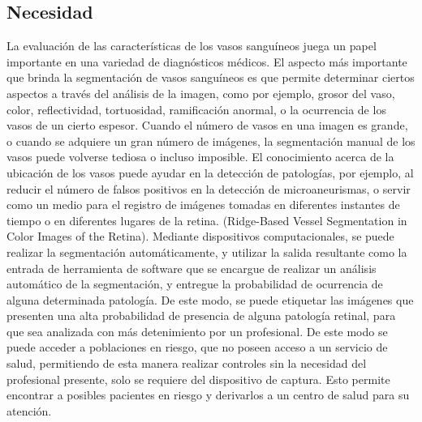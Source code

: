 \subsection{Necesidad}
La evaluaci\'on de las caracter\'isticas de los vasos sangu\'ineos  juega un papel importante en una variedad de diagn\'osticos m\'edicos. El aspecto m\'as importante que brinda la segmentaci\'on de vasos sangu\'ineos es que permite determinar ciertos aspectos a trav\'es del an\'alisis de la imagen, como por ejemplo, grosor del vaso, color, reflectividad, tortuosidad, ramificaci\'on anormal, o la ocurrencia de los vasos de un cierto espesor. Cuando el n\'umero de vasos en una imagen es grande, o cuando se adquiere un gran n\'umero de im\'agenes, la segmentaci\'on manual de los vasos puede volverse tediosa o incluso imposible. El conocimiento acerca de la ubicaci\'on de los vasos puede ayudar en la detecci\'on de patolog\'ias, por ejemplo, al reducir el n\'umero de falsos positivos en la detecci\'on de microaneurismas, o servir como un medio para el registro de im\'agenes tomadas en diferentes instantes de tiempo o en diferentes lugares de la retina. (Ridge-Based Vessel Segmentation in Color Images of the Retina).
Mediante dispositivos computacionales, se puede realizar la segmentación autom\'aticamente, y utilizar la salida resultante como la entrada de herramienta de software que se encargue de  realizar un an\'alisis autom\'atico de la segmentaci\'on, y entregue la probabilidad de ocurrencia de alguna determinada patolog\'ia. De este modo, se puede etiquetar las im\'agenes que presenten una alta  probabilidad de presencia de alguna patolog\'ia retinal, para que sea analizada con m\'as detenimiento por un profesional. De este modo se puede acceder a poblaciones en riesgo, que no poseen acceso a un servicio de salud, permitiendo de esta manera realizar controles sin la necesidad del profesional presente, solo se requiere del dispositivo de captura. Esto permite encontrar a posibles pacientes en riesgo y derivarlos a un centro de salud para su atenci\'on.



